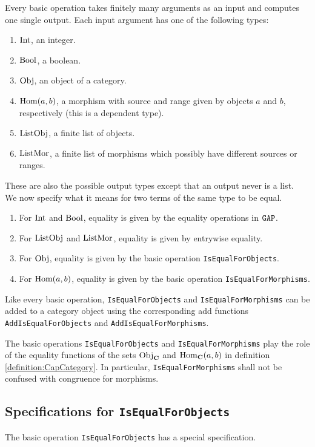 Every basic operation takes finitely many arguments as an input and computes one single output.
Each input argument has one of the following types:
\begin{enumerate}
 \item $\mathrm{Int}$, an integer.
 \item $\mathrm{Bool}$, a boolean.
 \item $\mathrm{Obj}$, an object of a category.
 \item $\operatorname{\mathrm{Hom}}( a, b )$, a morphism with source and range given by objects $a$ and $b$, respectively (this is a dependent type).
 \item $\mathrm{ListObj}$, a finite list of objects.
 \item $\mathrm{ListMor}$, a finite list of morphisms which possibly have different sources or ranges.
\end{enumerate}
These are also the possible output types except that an output never is a list. \\
We now specify what it means for two terms of the same type to be equal.
\begin{enumerate}
 \item For $\mathrm{Int}$ and $\mathrm{Bool}$, equality is given by the equality operations in $\texttt{GAP}$.
 \item For $\mathrm{ListObj}$ and $\mathrm{ListMor}$, equality is given by entrywise equality.
 \item For $\mathrm{Obj}$, equality is given by the basic operation \texttt{IsEqualForObjects}.
 \item For $\operatorname{\mathrm{Hom}}( a, b )$, equality is given by the basic operation \texttt{IsEqualForMorphisms}.
\end{enumerate}

Like every basic operation, \texttt{IsEqualForObjects} and \texttt{IsEqualForMorphisms} can be added to 
a category object using the corresponding add functions \texttt{AddIsEqualForObjects} and \texttt{AddIsEqualForMorphisms}.

\begin{remark}
 The basic operations \texttt{IsEqualForObjects} and \texttt{IsEqualForMorphisms} play the role
 of the equality functions of the sets $\mathrm{Obj}_{\mathbf{C}}$ and $\operatorname{\mathrm{Hom}}_{\mathbf{C}}(a,b)$ in definition
 \ref{definition:CapCategory}. In particular, \texttt{IsEqualForMorphisms} shall not be confused
 with congruence for morphisms.
\end{remark}


\subsection{Specifications for \texttt{IsEqualForObjects}}
The basic operation \texttt{IsEqualForObjects} has a special specification.

